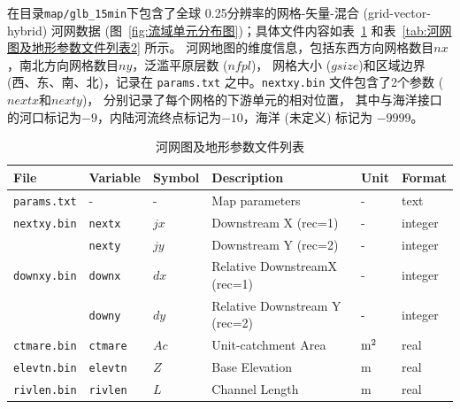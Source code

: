 在目录\texttt{map/glb\_15min}下包含了全球 0.25\textdegree 分辨率的网格-矢量-混合 (grid-vector-hybrid) 河网数据 (图~\ref{fig:流域单元分布图})；具体文件内容如表~\ref{tab:河网图及地形参数文件列表} 和表~\ref{tab:河网图及地形参数文件列表2} 所示。 河网地图的维度信息，包括东西方向网格数目$nx$，南北方向网格数目$ny$，泛滥平原层数 ($nfpl$)，
网格大小 ($gsize$)和区域边界 (西、东、南、北)，记录在 \texttt{params.txt} 之中。\texttt{nextxy.bin} 文件包含了2个参数 ($nextx$和$nexty$)，
分别记录了每个网格的下游单元的相对位置，
其中与海洋接口的河口标记为$-9$，内陆河流终点标记为$-10$，海洋 (未定义) 标记为 $-9999$。

\begin{table}[htbp]
\centering
\caption{河网图及地形参数文件列表}
\label{tab:河网图及地形参数文件列表}
    \begin{tabular}[h]{p{3.5cm}p{1.5cm}p{1.5cm}p{5cm}p{1cm}p{1cm}}  %
    \toprule
    File              & Variable & Symbol                        & Description                                  & Unit    & Format  \\ \midrule
    \texttt{params.txt}        & -        & -                             & Map parameters                     & -         & text    \\
    \texttt{nextxy.bin}        & \texttt{nextx}    & $jx$                         & Downstream X (rec=1)         & -         & integer \\
                                       & \texttt{nexty}    & $jy$                         & Downstream Y (rec=2)            & -        & integer \\
    \texttt{downxy.bin}      & \texttt{downx}   & $dx$                        & Relative DownstreamX (rec=1)   & -   & integer \\
                                       & \texttt{downy}   & $dy$                      & Relative Downstream Y (rec=2)   & -    & integer \\
    \texttt{ctmare.bin}       & \texttt{ctmare}   & $Ac$                     & Unit-catchment Area                     & $\rm m^2$   & real    \\
    \texttt{elevtn.bin}        & \texttt{elevtn}    & $Z$                        & Base Elevation                         & m       & real    \\
    \texttt{rivlen.bin}         & \texttt{rivlen}    & $L$                         & Channel Length                        & m       & real    \\

\end{tabular}
\end{table}

